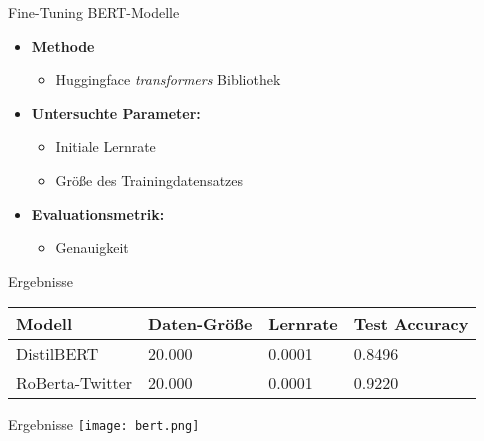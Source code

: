 \documentclass[aspectratio=169]{beamer} %
\begin{document}
\begin{frame}{Fine-Tuning BERT-Modelle}
\begin{itemize}
        \item \textbf{Methode}
            \begin{itemize}
                \item Huggingface \textit{transformers} Bibliothek
            \end{itemize}
        \item \textbf{Untersuchte Parameter:}
        \begin{itemize}
            \item Initiale Lernrate
            \item Größe des Trainingdatensatzes
        \end{itemize}
        \item \textbf{Evaluationsmetrik:}
        \begin{itemize}
            \item Genauigkeit
        \end{itemize}
\end{itemize}  
\end{frame}

\begin{frame}{Ergebnisse}
    \centering
    \scriptsize
    \begin{tabular}{|l|l|l|l|}
        \hline
        \textbf{Modell} & \textbf{Daten-Größe} & \textbf{Lernrate} & \textbf{Test Accuracy} \\
        \hline
        DistilBERT & 20.000 & 0.0001 & 0.8496 \\
        RoBerta-Twitter & 20.000 & 0.0001 & 0.9220 \\
        \hline
    \end{tabular}
\end{frame}

\begin{frame}{Ergebnisse}
    \centering
     \texttt{[image: bert.png]}
\end{frame}






\end{document}
